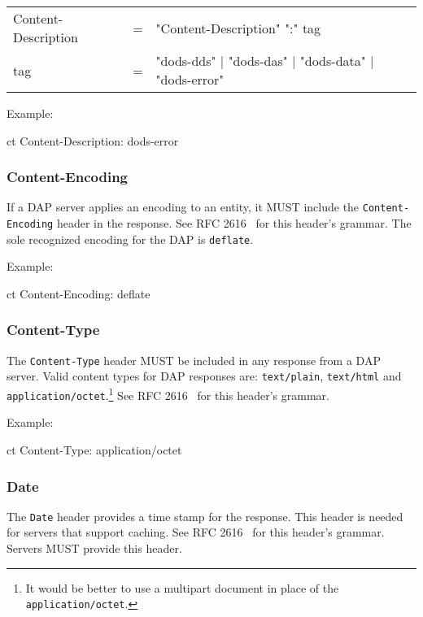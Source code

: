 \documentclass{article}
\begin{document}
\begin{ttfamily}
\begin{center}
\begin{tabular}{lll}
Content-Description & = & "Content-Description" ":" tag \\
tag & = & "dods-dds" | "dods-das" | "dods-data" | "dods-error" \\
\end{tabular}
\end{center}
\end{ttfamily}

Example:
\begin{vcode}{ct}
Content-Description: dods-error
\end{vcode}

\subsubsection{Content-Encoding}
If a \ac{DAP} server applies an encoding to an entity, it MUST include the
\texttt{Content-Encoding} header in the response. See RFC 2616~\cite{rfc2616}
for this header's grammar. The sole recognized encoding for the \ac{DAP} is \texttt{deflate}.

Example:
\begin{vcode}{ct}
Content-Encoding: deflate
\end{vcode}

\subsubsection{Content-Type}
The \texttt{Content-Type} header MUST be included in any response from a
\ac{DAP} server. Valid content types for \ac{DAP} responses are:
\texttt{text/plain}, \texttt{text/html} and
\texttt{application/octet}.\footnote{It would be better to use a multipart
  document in place of the \texttt{application/octet}.} See RFC
2616~\cite{rfc2616} for this header's grammar.

Example:
\begin{vcode}{ct}
Content-Type: application/octet
\end{vcode}

\subsubsection{Date}
The \texttt{Date} header provides a time stamp for the response. This header
is needed for servers that support caching. See RFC 2616~\cite{rfc2616}
for this header's grammar. Servers MUST provide this header.
\end{document}
